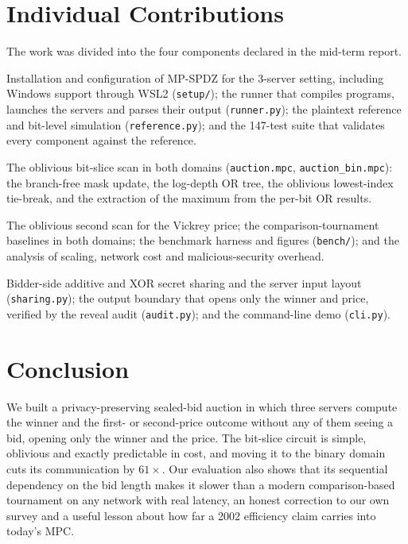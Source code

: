 \documentclass[11pt,a4paper]{article}
\newcommand{\code}[1]{\texttt{#1}}
\begin{document}
\section{Individual Contributions}

The work was divided into the four components declared in the mid-term report.

\begin{description}[style=nextline, leftmargin=1.2em]
  \item[Aarav Oswal (230012): computation environment and testing]
        Installation and configuration of MP-SPDZ for the 3-server setting, including Windows
        support through WSL2 (\code{setup/}); the runner that compiles programs, launches the
        servers and parses their output (\code{runner.py}); the plaintext reference and bit-level
        simulation (\code{reference.py}); and the 147-test suite that validates every component
        against the reference.
  \item[Ch.\ Rishitha (230311): bit-slice maximum circuit]
        The oblivious bit-slice scan in both domains (\code{auction.mpc}, \code{auction\_bin.mpc}):
        the branch-free mask update, the log-depth OR tree, the oblivious lowest-index tie-break,
        and the extraction of the maximum from the per-bit OR results.
  \item[R.\ Charan (230819): Vickrey extension and performance evaluation]
        The oblivious second scan for the Vickrey price; the comparison-tournament baselines in
        both domains; the benchmark harness and figures (\code{bench/}); and the analysis of
        scaling, network cost and malicious-security overhead.
  \item[Poorvie Sadagopan (230759): input and output pipeline]
        Bidder-side additive and XOR secret sharing and the server input layout
        (\code{sharing.py}); the output boundary that opens only the winner and price, verified by
        the reveal audit (\code{audit.py}); and the command-line demo (\code{cli.py}).
\end{description}

\section{Conclusion}

We built a privacy-preserving sealed-bid auction in which three servers compute the winner and
the first- or second-price outcome without any of them seeing a bid, opening only the winner and
the price. The bit-slice circuit is simple, oblivious and exactly predictable in cost, and moving
it to the binary domain cuts its communication by $61\times$. Our evaluation also shows that its
sequential dependency on the bid length makes it slower than a modern comparison-based tournament
on any network with real latency, an honest correction to our own survey and a useful lesson about
how far a 2002 efficiency claim carries into today's MPC.
\end{document}
